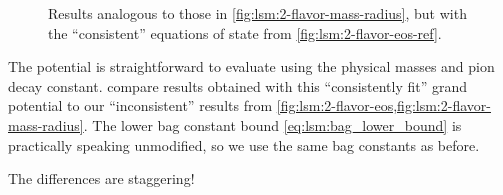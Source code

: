 \begin{figure}[th!]
\caption{\label{fig:lsm:2-flavor-mass-radius-ref}%
Results analogous to those in \cref{fig:lsm:2-flavor-mass-radius}, but with the ``consistent'' equations of state from \cref{fig:lsm:2-flavor-eos-ref}.
}
\end{figure}

The potential is straightforward to evaluate using the physical masses and pion decay constant.
 compare results obtained with this ``consistently fit'' grand potential to our ``inconsistent'' results from \cref{fig:lsm:2-flavor-eos,fig:lsm:2-flavor-mass-radius}.
The lower bag constant bound \eqref{eq:lsm:bag_lower_bound} is practically speaking unmodified, so we use the same bag constants as before.

The differences are staggering!
